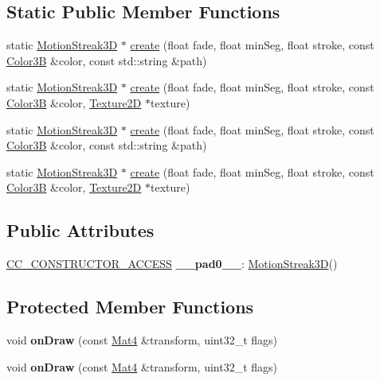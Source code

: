 \subsection*{Static Public Member Functions}
\begin{DoxyCompactItemize}
\item 
static \hyperlink{classMotionStreak3D}{Motion\+Streak3D} $\ast$ \hyperlink{classMotionStreak3D_a2f965f35588cdb7611269b6e0d0f44a2}{create} (float fade, float min\+Seg, float stroke, const \hyperlink{structColor3B}{Color3B} \&color, const std\+::string \&path)
\item 
static \hyperlink{classMotionStreak3D}{Motion\+Streak3D} $\ast$ \hyperlink{classMotionStreak3D_ab0660c5cf12f18aa1828bef2dbb9fd93}{create} (float fade, float min\+Seg, float stroke, const \hyperlink{structColor3B}{Color3B} \&color, \hyperlink{classTexture2D}{Texture2D} $\ast$texture)
\item 
static \hyperlink{classMotionStreak3D}{Motion\+Streak3D} $\ast$ \hyperlink{classMotionStreak3D_a89cc5717ddfbde59d8ed94db36feb09c}{create} (float fade, float min\+Seg, float stroke, const \hyperlink{structColor3B}{Color3B} \&color, const std\+::string \&path)
\item 
static \hyperlink{classMotionStreak3D}{Motion\+Streak3D} $\ast$ \hyperlink{classMotionStreak3D_a7b271f557b9f7fabda648254f8dce80c}{create} (float fade, float min\+Seg, float stroke, const \hyperlink{structColor3B}{Color3B} \&color, \hyperlink{classTexture2D}{Texture2D} $\ast$texture)
\end{DoxyCompactItemize}
\subsection*{Public Attributes}
\begin{DoxyCompactItemize}
\item 
\mbox{\label{classMotionStreak3D_a16fe484ac30c063e0421c26bfb4e1eaf}} 
\hyperlink{_2cocos2d_2cocos_2base_2ccConfig_8h_a25ef1314f97c35a2ed3d029b0ead6da0}{C\+C\+\_\+\+C\+O\+N\+S\+T\+R\+U\+C\+T\+O\+R\+\_\+\+A\+C\+C\+E\+SS} {\bfseries \+\_\+\+\_\+pad0\+\_\+\+\_\+}\+: \hyperlink{classMotionStreak3D}{Motion\+Streak3D}()
\end{DoxyCompactItemize}
\subsection*{Protected Member Functions}
\begin{DoxyCompactItemize}
\item 
\mbox{\label{classMotionStreak3D_aab5bfc20c34a01150cc882bf5193531f}} 
void {\bfseries on\+Draw} (const \hyperlink{classMat4}{Mat4} \&transform, uint32\+\_\+t flags)
\item 
\mbox{\label{classMotionStreak3D_aab5bfc20c34a01150cc882bf5193531f}} 
void {\bfseries on\+Draw} (const \hyperlink{classMat4}{Mat4} \&transform, uint32\+\_\+t flags)
\end{DoxyCompactItemize}
